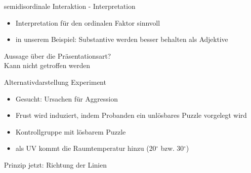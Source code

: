 \documentclass{beamer}
\begin{document}
	\begin{frame}{semidisordinale Interaktion - Interpretation}
		\begin{itemize}
			\item Interpretation für den ordinalen Faktor sinnvoll
			\item in unserem Beispiel: Substantive werden besser behalten als Adjektive
		\end{itemize}
		\alert{Aussage über die Präsentationsart?}
		\pause \\
		Kann nicht getroffen werden
	\end{frame}
	
	\begin{frame}{Alternativdarstellung}
		Experiment
		\begin{itemize}
			\item Gesucht: Ursachen für Aggression
			\item Frust wird induziert, indem Probanden ein unlösbares Puzzle vorgelegt wird
			\item Kontrollgruppe mit lösbarem Puzzle
			\item als UV kommt die Raumtemperatur hinzu (20$^{\circ}$ bzw. 30$^{\circ}$)
		\end{itemize}
		Prinzip jetzt: Richtung der Linien
	\end{frame}
	
\end{document}
